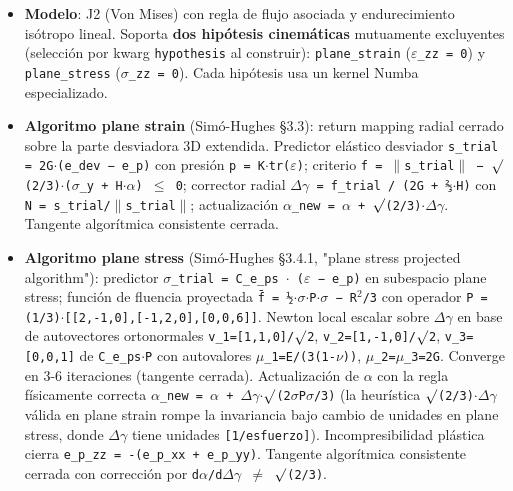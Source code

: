 \documentclass[11pt,letterpaper,oneside]{report}
\begin{document}
\begin{itemize}
  \item \textbf{Modelo}: J2 (Von Mises) con regla de flujo asociada y endurecimiento isótropo lineal. Soporta \textbf{dos hipótesis cinemáticas} mutuamente excluyentes (selección por kwarg \texttt{hypothesis} al construir): \texttt{plane\_strain} (\texttt{\ensuremath{\varepsilon}\_zz = 0}) y \texttt{plane\_stress} (\texttt{\ensuremath{\sigma}\_zz = 0}). Cada hipótesis usa un kernel Numba especializado.
  \item \textbf{Algoritmo plane strain} (Simó-Hughes §3.3): return mapping radial cerrado sobre la parte desviadora 3D extendida. Predictor elástico desviador \texttt{s\_trial = 2G\ensuremath{\cdot}(e\_dev − e\_p)} con presión \texttt{p = K\ensuremath{\cdot}tr(\ensuremath{\varepsilon})}; criterio \texttt{f = \ensuremath{\|}s\_trial\ensuremath{\|} − \ensuremath{\surd}(2/3)\ensuremath{\cdot}(\ensuremath{\sigma}\_y + H\ensuremath{\cdot}\ensuremath{\alpha}) \ensuremath{\le} 0}; corrector radial \texttt{\ensuremath{\Delta}\ensuremath{\gamma} = f\_trial / (2G + ⅔\ensuremath{\cdot}H)} con \texttt{N = s\_trial/\ensuremath{\|}s\_trial\ensuremath{\|}}; actualización \texttt{\ensuremath{\alpha}\_new = \ensuremath{\alpha} + \ensuremath{\surd}(2/3)\ensuremath{\cdot}\ensuremath{\Delta}\ensuremath{\gamma}}. Tangente algorítmica consistente cerrada.
  \item \textbf{Algoritmo plane stress} (Simó-Hughes §3.4.1, "plane stress projected algorithm"): predictor \texttt{\ensuremath{\sigma}\_trial = C\_e\_ps \ensuremath{\cdot} (\ensuremath{\varepsilon} − e\_p)} en subespacio plane stress; función de fluencia proyectada \texttt{f̄ = ½\ensuremath{\cdot}\ensuremath{\sigma}\ensuremath{\cdot}P\ensuremath{\cdot}\ensuremath{\sigma} − R\ensuremath{^{2}}/3} con operador \texttt{P = (1/3)\ensuremath{\cdot}[[2,-1,0],[-1,2,0],[0,0,6]]}. Newton local escalar sobre \texttt{\ensuremath{\Delta}\ensuremath{\gamma}} en base de autovectores ortonormales \texttt{v\_1=[1,1,0]/\ensuremath{\surd}2}, \texttt{v\_2=[1,-1,0]/\ensuremath{\surd}2}, \texttt{v\_3=[0,0,1]} de \texttt{C\_e\_ps\ensuremath{\cdot}P} con autovalores \texttt{\ensuremath{\mu}\_1=E/(3(1-\ensuremath{\nu}))}, \texttt{\ensuremath{\mu}\_2=\ensuremath{\mu}\_3=2G}. Converge en 3-6 iteraciones (tangente cerrada). Actualización de \texttt{\ensuremath{\alpha}} con la regla físicamente correcta \texttt{\ensuremath{\alpha}\_new = \ensuremath{\alpha} + \ensuremath{\Delta}\ensuremath{\gamma}\ensuremath{\cdot}\ensuremath{\surd}(2\ensuremath{\sigma}P\ensuremath{\sigma}/3)} (la heurística \texttt{\ensuremath{\surd}(2/3)\ensuremath{\cdot}\ensuremath{\Delta}\ensuremath{\gamma}} válida en plane strain rompe la invariancia bajo cambio de unidades en plane stress, donde \texttt{\ensuremath{\Delta}\ensuremath{\gamma}} tiene unidades \texttt{[1/esfuerzo]}). Incompresibilidad plástica cierra \texttt{e\_p\_zz = -(e\_p\_xx + e\_p\_yy)}. Tangente algorítmica consistente cerrada con corrección por \texttt{d\ensuremath{\alpha}/d\ensuremath{\Delta}\ensuremath{\gamma} \ensuremath{\neq} \ensuremath{\surd}(2/3)}.

\end{itemize}
\end{document}
